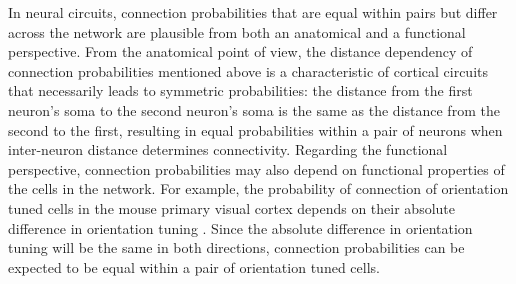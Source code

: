 

In neural circuits, connection probabilities that are equal within pairs but differ across the network are plausible from both an anatomical and a functional perspective. From the anatomical point of view, the distance dependency of connection probabilities mentioned above is a characteristic of cortical circuits that necessarily leads to symmetric probabilities: the distance from the first neuron's soma to the second neuron's soma is the same as the distance from the second to the first, resulting in equal probabilities within a pair of neurons when inter-neuron distance determines connectivity. Regarding the functional perspective, connection probabilities may also depend on functional properties of the cells in the network. For example, the probability of connection of orientation tuned cells in the mouse primary visual cortex depends on their absolute difference in orientation tuning \cite{Lee2016a, Ko2011}. Since the absolute difference in orientation tuning will be the same in both directions, connection probabilities can be expected to be equal within a pair of orientation tuned cells.


